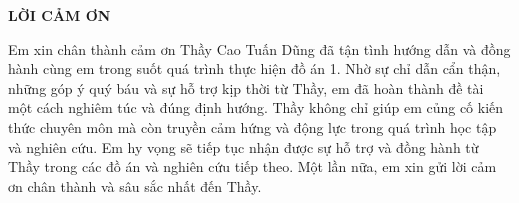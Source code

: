 \documentclass[../DoAn.tex]{subfiles}
\begin{document}
\begin{center}
    \Large{\textbf{LỜI CẢM ƠN}}\\
\end{center}
\vspace{1cm}
Em xin chân thành cảm ơn Thầy Cao Tuấn Dũng đã tận tình hướng dẫn và đồng hành cùng em trong suốt quá trình thực hiện đồ án 1. Nhờ sự chỉ dẫn cẩn thận, những góp ý quý báu và sự hỗ trợ kịp thời từ Thầy, em đã hoàn thành đề tài một cách nghiêm túc và đúng định hướng. Thầy không chỉ giúp em củng cố kiến thức chuyên môn mà còn truyền cảm hứng và động lực trong quá trình học tập và nghiên cứu. Em hy vọng sẽ tiếp tục nhận được sự hỗ trợ và đồng hành từ Thầy trong các đồ án và nghiên cứu tiếp theo. Một lần nữa, em xin gửi lời cảm ơn chân thành và sâu sắc nhất đến Thầy.
\end{document}
